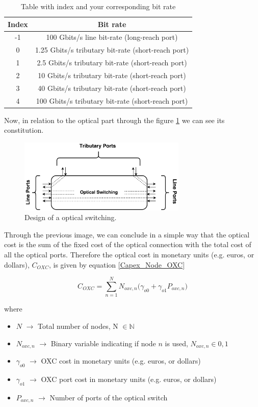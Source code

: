 \begin{table}[h!]
\centering
\begin{tabular}{|c|c|}
  \hline
  Index & Bit rate \\
 \hline\hline
  -1 & 100 Gbits/s line bit-rate (long-reach port) \\
  0 & 1.25 Gbits/s tributary bit-rate (short-reach port) \\
  1 & 2.5 Gbits/s tributary bit-rate (short-reach port) \\
  2 & 10 Gbits/s tributary bit-rate (short-reach port) \\
  3 & 40 Gbits/s tributary bit-rate (short-reach port) \\
  4 & 100 Gbits/s tributary bit-rate (short-reach port) \\
  \hline
\end{tabular}
\caption{Table with index and your corresponding bit rate}
\label{table_bitrate}
\end{table}

Now, in relation to the optical part through the figure \ref{oxc_design} we can see its constitution.\\

\begin{figure}[h!]
\centering
\includegraphics[width=8cm]{sdf/ILP/figures/oxc_design}
\caption{Design of a optical switching.}
\label{oxc_design}
\end{figure}

Through the previous image, we can conclude in a simple way that the optical cost is the sum of the fixed cost of the optical connection with the total cost of all the optical ports.
Therefore the optical cost in monetary units (e.g. euros, or dollars), $C_{OXC}$, is given by equation \ref{Capex_Node_OXC}

\begin{equation}
C_{OXC} = \sum_{n=1}^{N} N_{oxc,n} \bigg( \gamma_{o0} + \gamma_{o1} P_{oxc,n} \bigg)
\label{Capex_Node_OXC}
\end{equation}

\noindent
where
\begin{itemize}
\item{$N$				$\rightarrow$	Total number of nodes, N $\in \mathbb{N}$}
\item{$N_{oxc,n}$		$\rightarrow$	Binary variable indicating if node $n$ is used, $N_{oxc,n} \in {0, 1}$}
\item{$\gamma_{o0}$ 	$\rightarrow$	OXC cost in monetary units (e.g. euros, or dollars)}
\item{$\gamma_{o1}$ 	$\rightarrow$	OXC port cost in monetary units (e.g. euros, or dollars) }
\item{$P_{oxc,n}$	    $\rightarrow$	Number of ports of the optical switch}
\end{itemize}


